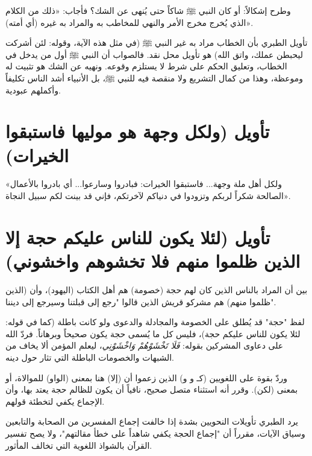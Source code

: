 وطرح  إشكالاً: أو كان النبي ﷺ شاكاً حتى يُنهى عن الشك؟
فأجاب: «ذلك من الكلام الذي يُخرج مخرج الأمر والنهي للمخاطب به والمراد به غيره (أي أمته)».

\begin{fawaid}
تأويل الطبري بأن الخطاب مراد به غير النبي ﷺ (في مثل هذه الآية، وقوله: لئن أشركت ليحبطن عملك، واتق الله) هو تأويل محل نقد. فالصواب أن النبي ﷺ أول من يدخل في الخطاب، وتعليق الحكم على شرط لا يستلزم وقوعه. ونهيه عن الشك هو تثبيت له وموعظة، وهذا من كمال التشريع ولا منقصة فيه للنبي ﷺ، بل الأنبياء أشد الناس تكليفاً وأكملهم عبودية.
\end{fawaid}

\separator

\section{تأويل (ولكل وجهة هو موليها فاستبقوا الخيرات)}
 «ولكل أهل ملة وجهة... فاستبقوا الخيرات: فبادروا وسارعوا... أي بادروا بالأعمال الصالحة شكراً لربكم وتزودوا في دنياكم لآخرتكم، فإني قد بينت لكم سبيل النجاة».

\separator

\section{تأويل (لئلا يكون للناس عليكم حجة إلا الذين ظلموا منهم فلا تخشوهم واخشوني)}
بين  أن المراد بالناس الذين كان لهم حجة (خصومة) هم أهل الكتاب (اليهود)، وأن (الذين ظلموا منهم) هم مشركو قريش الذين قالوا "رجع إلى قبلتنا وسيرجع إلى ديننا".

\begin{fawaid}
لفظ "حجة" قد يُطلق على الخصومة والمجادلة والدعوى ولو كانت باطلة (كما في قوله: لئلا يكون للناس عليكم حجة)، فليس كل ما يُسمى حجة يكون صحيحاً وبرهاناً. فردّ الله على دعاوى المشركين بقوله: \textit{فَلَا تَخْشَوْهُمْ وَاخْشَوْنِي}، ليعلم المؤمن ألا يخاف من الشبهات والخصومات الباطلة التي تثار حول دينه.
\end{fawaid}

وردّ  بقوة على اللغويين (كـ  و و) الذين زعموا أن (إلا) هنا بمعنى (الواو) للموالاة، أو بمعنى (لكن). وقرر أنه استثناء متصل صحيح، نافياً أن يكون للظالم حجة يعتد بها، وأن الإجماع يكفي لتخطئة قولهم.

\begin{fawaid}
يرد الطبري تأويلات النحويين بشدة إذا خالفت إجماع المفسرين من الصحابة والتابعين وسياق الآيات، مقرراً أن "إجماع الحجة يكفي شاهداً على خطأ مقالتهم"، ولا يصح تفسير القرآن بالشواذ اللغوية التي تخالف المأثور.
\end{fawaid}


